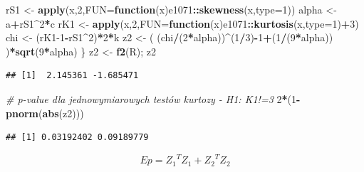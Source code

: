 \documentclass[polish,]{book}
\newenvironment{Shaded}{\begin{snugshade}}{\end{snugshade}}
\newcommand{\CommentTok}[1]{\textcolor[rgb]{0.56,0.35,0.01}{\textit{#1}}}
\newcommand{\ControlFlowTok}[1]{\textcolor[rgb]{0.13,0.29,0.53}{\textbf{#1}}}
\newcommand{\DataTypeTok}[1]{\textcolor[rgb]{0.13,0.29,0.53}{#1}}
\newcommand{\DecValTok}[1]{\textcolor[rgb]{0.00,0.00,0.81}{#1}}
\newcommand{\KeywordTok}[1]{\textcolor[rgb]{0.13,0.29,0.53}{\textbf{#1}}}
\newcommand{\NormalTok}[1]{#1}
\newcommand{\OperatorTok}[1]{\textcolor[rgb]{0.81,0.36,0.00}{\textbf{#1}}}
\newcommand{\StringTok}[1]{\textcolor[rgb]{0.31,0.60,0.02}{#1}}
\begin{document}
\begin{Shaded}
\begin{Highlighting}[]
\NormalTok{  rS1 <-}\StringTok{ }\KeywordTok{apply}\NormalTok{(x,}\DecValTok{2}\NormalTok{,}\DataTypeTok{FUN=}\ControlFlowTok{function}\NormalTok{(x)e1071}\OperatorTok{::}\KeywordTok{skewness}\NormalTok{(x,}\DataTypeTok{type=}\DecValTok{1}\NormalTok{))}
\NormalTok{  alpha <-}\StringTok{ }\NormalTok{a}\OperatorTok{+}\NormalTok{rS1}\OperatorTok{^}\DecValTok{2}\OperatorTok{*}\NormalTok{c}
\NormalTok{  rK1 <-}\StringTok{ }\KeywordTok{apply}\NormalTok{(x,}\DecValTok{2}\NormalTok{,}\DataTypeTok{FUN=}\ControlFlowTok{function}\NormalTok{(x)e1071}\OperatorTok{::}\KeywordTok{kurtosis}\NormalTok{(x,}\DataTypeTok{type=}\DecValTok{1}\NormalTok{)}\OperatorTok{+}\DecValTok{3}\NormalTok{)}
\NormalTok{  chi <-}\StringTok{ }\NormalTok{(rK1}\DecValTok{-1}\OperatorTok{-}\NormalTok{rS1}\OperatorTok{^}\DecValTok{2}\NormalTok{)}\OperatorTok{*}\DecValTok{2}\OperatorTok{*}\NormalTok{k}
\NormalTok{  z2 <-}\StringTok{ }\NormalTok{( (chi}\OperatorTok{/}\NormalTok{(}\DecValTok{2}\OperatorTok{*}\NormalTok{alpha))}\OperatorTok{^}\NormalTok{(}\DecValTok{1}\OperatorTok{/}\DecValTok{3}\NormalTok{)}\OperatorTok{-}\DecValTok{1}\OperatorTok{+}\NormalTok{(}\DecValTok{1}\OperatorTok{/}\NormalTok{(}\DecValTok{9}\OperatorTok{*}\NormalTok{alpha)) )}\OperatorTok{*}\KeywordTok{sqrt}\NormalTok{(}\DecValTok{9}\OperatorTok{*}\NormalTok{alpha)}
\NormalTok{  \}}
\NormalTok{z2 <-}\StringTok{ }\KeywordTok{f2}\NormalTok{(R); z2}
\end{Highlighting}
\end{Shaded}

\begin{verbatim}
## [1]  2.145361 -1.685471
\end{verbatim}

\begin{Shaded}
\begin{Highlighting}[]
\CommentTok{# p-value dla jednowymiarowych testów kurtozy - H1: K1!=3}
\DecValTok{2}\OperatorTok{*}\NormalTok{(}\DecValTok{1}\OperatorTok{-}\KeywordTok{pnorm}\NormalTok{(}\KeywordTok{abs}\NormalTok{(z2)))}
\end{Highlighting}
\end{Shaded}

\begin{verbatim}
## [1] 0.03192402 0.09189779
\end{verbatim}

\begin{equation}
Ep={Z_1}^TZ_1+{Z_2}^TZ_2
\label{eq:wz1128}
\end{equation}

\begin{Shaded}
\end{Shaded}
\end{document}
